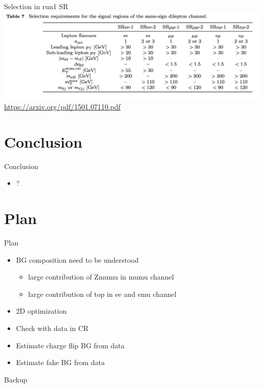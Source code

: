 \documentclass[mathserif,serif]{beamer}
\begin{document}
\begin{frame}{Selection in run1 SR}
\includegraphics[width=\textwidth]{data/photo/SRcutrun1.png} \\
\url{https://arxiv.org/pdf/1501.07110.pdf}
\end{frame}




\section{Conclusion}
\begin{frame}{Conclusion}
\begin{itemize}
\item ?
\end{itemize}
\end{frame}

\section{Plan}
\begin{frame}{Plan}
\begin{itemize}
\item BG composition need to be understood
\begin{itemize}
\item large contribution of Zmumu in mumu channel
\item large contribution of top in ee and emu channel
\end{itemize}
\item 2D optimization
\item Check with data in CR
\item Estimate charge flip BG from data
\item Estimate fake BG from data
\end{itemize}
\end{frame}

\begin{frame}
\begin{center}
\huge
Backup
\end{center}
\end{frame}
\end{document}

